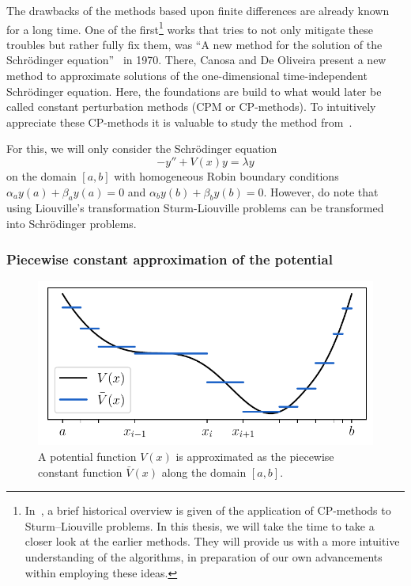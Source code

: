 The drawbacks of the methods based upon finite differences are already known for a long time. One of the first\footnote{In~\cite{ledoux_solving_2010}, a brief historical overview is given of the application of CP-methods to Sturm--Liouville problems. In this thesis, we will take the time to take a closer look at the earlier methods. They will provide us with a more intuitive understanding of the algorithms, in preparation of our own advancements within employing these ideas.} works that tries to not only mitigate these troubles but rather fully fix them, was ``A new method for the solution of the Schrödinger equation''~\cite{canosa_new_1970} in 1970. There, Canosa and De Oliveira present a new method to approximate solutions of the one-dimensional time-independent Schrödinger equation. Here, the foundations are build to what would later be called constant perturbation methods (CPM or CP-methods). To intuitively appreciate these CP-methods it is valuable to study the method from~\cite{canosa_new_1970}.

For this, we will only consider the Schrödinger equation
\begin{equation}\label{equ:c2_cpm_schrodinger}
    - y'' + V(x) y = \lambda y
\end{equation}
on the domain $[a, b]$ with homogeneous Robin boundary conditions $\alpha_a y(a) + \beta_a y(a) = 0$ and $\alpha_b y(b) + \beta_b y(b) = 0$. However, do note that using Liouville's transformation Sturm-Liouville problems can be transformed into Schrödinger problems.

\subsubsection{Piecewise constant approximation of the potential}

\begin{figure}
    \begin{center}
        \includegraphics[width=\textwidth]{img/chapter2/cpm_constant_approx.pdf}
        \caption{A potential function $V(x)$ is approximated as the piecewise constant function $\bar{V}(x)$ along the domain $[a, b]$.}
        \label{fig:c2_cpm_constant_approx}
    \end{center}
\end{figure}

